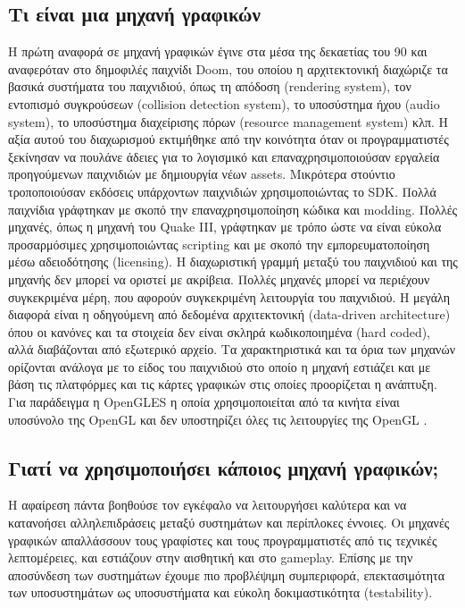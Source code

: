 	\subsection {Τι είναι μια μηχανή γραφικών}
	Η πρώτη αναφορά σε μηχανή γραφικών έγινε στα μέσα της δεκαετίας του 90 και αναφερόταν στο δημοφιλές παιχνίδι Doom, του οποίου η αρχιτεκτονική διαχώριζε τα βασικά συστήματα του παιχνιδιού, όπως τη απόδοση (rendering system), τον εντοπισμό συγκρούσεων (collision detection system), το υποσύστημα ήχου (audio system), το υποσύστημα διαχείρισης πόρων (resource management system) κλπ. Η αξία αυτού του διαχωρισμού εκτιμήθηκε από την κοινότητα όταν οι προγραμματιστές ξεκίνησαν να πουλάνε άδειες για το λογισμικό και επαναχρησιμοποιούσαν εργαλεία προηγούμενων παιχνιδιών με δημιουργία νέων assets. Μικρότερα στούντιο τροποποιούσαν εκδόσεις υπάρχοντων παιχνιδιών χρησιμοποιώντας το \gls{SDK}.
	Πολλά παιχνίδια γράφτηκαν με σκοπό την επαναχρησιμοποίηση κώδικα και \gls{modding}. Πολλές μηχανές, όπως η μηχανή του Quake III, γράφτηκαν με τρόπο ώστε να είναι εύκολα προσαρμόσιμες χρησιμοποιώντας scripting και με σκοπό την εμπορευματοποίηση μέσω αδειοδότησης (licensing).
	Η διαχωριστική γραμμή μεταξύ του παιχνιδιού και της μηχανής δεν μπορεί να οριστεί με ακρίβεια. Πολλές μηχανές μπορεί να περιέχουν συγκεκριμένα μέρη, που αφορούν συγκεκριμένη λειτουργία του παιχνιδιού. Η μεγάλη διαφορά είναι η οδηγούμενη από δεδομένα αρχιτεκτονική (data-driven architecture) όπου οι κανόνες και τα στοιχεία δεν είναι σκληρά κωδικοποιημένα (hard coded), αλλά διαβάζονται από εξωτερικό αρχείο.
	Τα χαρακτηριστικά και τα όρια των μηχανών ορίζονται ανάλογα με το είδος του παιχνιδιού στο οποίο η μηχανή εστιάζει και με βάση τις πλατφόρμες και τις κάρτες γραφικών στις οποίες προορίζεται η ανάπτυξη. Για παράδειγμα η \gls{OpenGLES} η οποία χρησιμοποιείται από τα κινήτα είναι υποσύνολο της \gls{OpenGL} και δεν υποστηρίζει όλες τις λειτουργίες της \gls{OpenGL} \cite{opengleslimitations}.
	
	\subsection{Γιατί να χρησιμοποιήσει κάποιος μηχανή γραφικών;}	
	Η αφαίρεση πάντα βοηθούσε τον εγκέφαλο να λειτουργήσει καλύτερα και να κατανοήσει αλληλεπιδράσεις μεταξύ συστημάτων και περίπλοκες έννοιες. Οι μηχανές γραφικών απαλλάσσουν τους γραφίστες και τους προγραμματιστές από τις τεχνικές λεπτομέρειες, και εστιάζουν στην αισθητική και στο gameplay. Επίσης με την αποσύνδεση των συστημάτων έχουμε πιο προβλέψιμη συμπεριφορά, επεκτασιμότητα των υποσυστημάτων ως υποσυστήματα και εύκολη δοκιμαστικότητα (testability).
	

